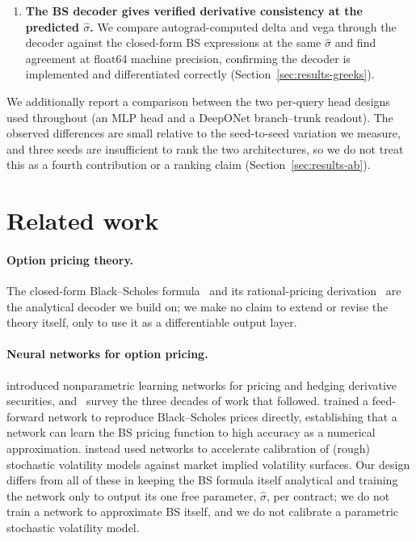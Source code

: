 \documentclass[11pt]{article}
\begin{document}
\begin{enumerate}[leftmargin=*]
the $21{\times}5$ SPX-history grid, and 344{,}192 for the $21{\times}4$ VIX-history grid, so input
content, timing, normalization, grid size, and capacity all vary together and the comparison is
between whole configurations, not raw inputs (Section~\ref{sec:limitations}).
\item \textbf{The BS decoder gives verified derivative consistency at the predicted $\hat\sigma$.} We
compare autograd-computed delta and vega through the decoder against the closed-form BS expressions at
the same $\hat\sigma$ and find agreement at float64 machine precision, confirming the decoder is
implemented and differentiated correctly (Section~\ref{sec:results-greeks}).
\end{enumerate}

We additionally report a comparison between the two per-query head designs used throughout (an MLP
head and a DeepONet branch--trunk readout). The observed differences are small relative to the
seed-to-seed variation we measure, and three seeds are insufficient to rank the two architectures, so
we do not treat this as a fourth contribution or a ranking claim (Section~\ref{sec:results-ab}).

\section{Related work}
\label{sec:related}

\paragraph{Option pricing theory.} The closed-form Black--Scholes formula~\citep{BlackScholes1973}
and its rational-pricing derivation~\citep{Merton1973} are the analytical decoder we build on; we make
no claim to extend or revise the theory itself, only to use it as a differentiable output layer.

\paragraph{Neural networks for option pricing.} \citet{Hutchinson1994Nonparametric} introduced
nonparametric learning networks for pricing and hedging derivative securities, and~\citet{RufWang2020Review}
survey the three decades of work that followed. \citet{Culkin2017} trained a feed-forward network to
reproduce Black--Scholes prices directly, establishing that a network can learn the BS pricing function
to high accuracy as a numerical approximation. \citet{Horvath2021DeepVol} instead used networks to
accelerate calibration of (rough) stochastic volatility models against market implied volatility
surfaces. Our design differs from all of these in keeping the BS formula itself analytical and training the
network only to output its one free parameter, $\hat\sigma$, per contract; we do not train a network to
approximate BS itself, and we do not calibrate a parametric stochastic volatility model.
\end{document}
